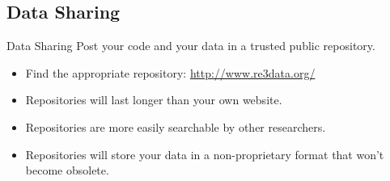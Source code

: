 \documentclass{beamer}
\begin{document}




\subsection{Data Sharing}
\begin{frame}{Data Sharing}
Post your code and your data in a trusted public repository.
\begin{itemize}[<.->]
\item
Find the appropriate repository: \url{http://www.re3data.org/}
\item
Repositories will last longer than your own website.
\item
Repositories are more easily searchable by other researchers.
\item
Repositories will store your data in a non-proprietary format that won't become obsolete.
\end{itemize}
\end{frame}
\end{document}
